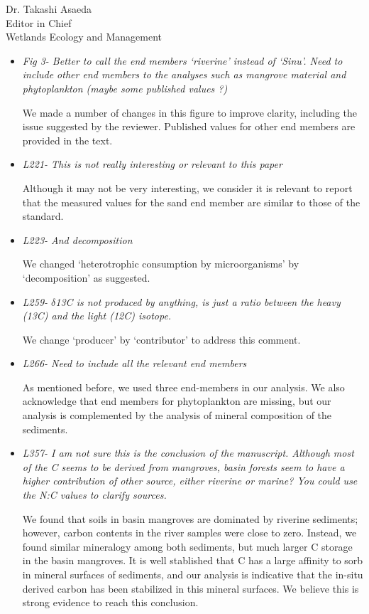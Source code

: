 \documentclass[11pt]{bgcletter}
\begin{document}
\begin{letter}{Dr. Takashi Asaeda\\
 Editor in Chief \\ Wetlands Ecology and Management}
\begin{itemize}
\item {\it Fig 3- Better to call the end members `riverine' instead of `Sinu'. Need to include other end members to the analyses such as mangrove material and phytoplankton (maybe some published values ?)}

{\color{blue} We made a number of changes in this figure to improve clarity, including the issue suggested by the reviewer. Published values for other end members are provided in the text.}

\item {\it L221- This is not really interesting or relevant to this paper}

{\color{blue} Although it may not be very interesting, we consider it is relevant to report that the measured values for the sand end member are similar to those of the standard.}

\item {\it L223- And decomposition}

{\color{blue} We changed `heterotrophic consumption by microorganisms' by `decomposition' as suggested.}

\item {\it L259- $\delta$13C is not produced by anything, is just a ratio between the heavy (13C) and the light (12C) isotope. }

{\color{blue} We change `producer' by `contributor' to address this comment.}

\item {\it L266- Need to include all the relevant end members}

{\color{blue} As mentioned before, we used three end-members in our analysis. We also acknowledge that end members for phytoplankton are missing, but our analysis is complemented by the analysis of mineral composition of the sediments. }

\item {\it L357- I am not sure this is the conclusion of the manuscript. Although most of the C seems to be derived from mangroves, basin forests seem to have a higher contribution of other source, either riverine or marine? You could use the N:C values to clarify sources. }

{\color{blue} We found that soils in basin mangroves are dominated by riverine sediments; however, carbon contents in the river samples were close to zero. Instead, we found similar mineralogy among both sediments, but much larger C storage in the basin mangroves. It is well stablished that C has a large affinity to sorb in mineral surfaces of sediments, and our analysis is indicative that the in-situ derived carbon has been stabilized in this mineral surfaces. We believe this is strong evidence to reach this conclusion. }


\end{itemize}
\end{letter}
\end{document}
